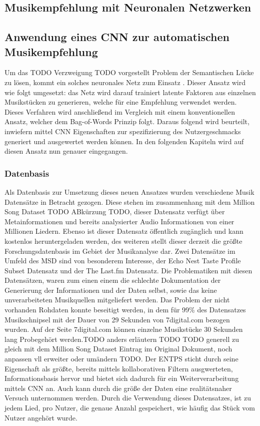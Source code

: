\documentclass[twosided,a4,10pt]{article}
\begin{document}
\begin{multicols}{2}
		\subsection{Musikempfehlung mit Neuronalen Netzwerken}
			\subsection*{Anwendung eines CNN zur automatischen Musikempfehlung}
		
		Um das TODO Verzweigung TODO vorgestellt Problem der Semantischen Lücke zu lösen, kommt ein solches neuronales Netz zum Einsatz \cite{oord}. Dieser Ansatz wird wie folgt umgesetzt: das Netz wird darauf trainiert latente Faktoren aus einzelnen Musikstücken zu generieren, welche für eine Empfehlung verwendet werden. Dieses Verfahren wird anschließend im Vergleich mit einem konventionellen Ansatz, welcher dem Bag-of-Words Prinzip folgt. Daraus folgend wird beurteilt, inwiefern mittel CNN Eigenschaften zur spezifizierung des Nutzergeschmacks generiert und ausgewertet werden können.  In den folgenden Kapiteln wird auf diesen Ansatz nun genauer eingegangen.
		
		\subsubsection{Datenbasis}
		
		Als Datenbasis zur Umsetzung dieses neuen Ansatzes wurden verschiedene Musik Datensätze in Betracht gezogen. Diese stehen im zusammenhang mit dem Million Song Dataset TODO ABkürzung TODO, dieser Datensatz verfügt über Metainformationen und bereits analysierter Audio Informationen von einer Millionen Liedern. Ebenso ist dieser Datensatz öffentlich zugänglich und kann kostenlos heruntergeladen werden, des weiteren stellt dieser derzeit die größte Forschungsdatenbasis im Gebiet der Musikanalyse dar. Zwei Datensätze im Umfeld des MSD sind von besonderem Interesse, der Echo Nest Taste Profile Subset Datensatz und der The Last.fm Datensatz. Die Problematiken mit diesen Datensätzen, waren zum einen einem die schlechte Dokumentation der Generierung der Informationen und der Daten selbst, sowie das keine unverarbeiteten Musikquellen mitgeliefert werden. Das Problem der nicht vorhanden Rohdaten konnte beseitigt werden, in dem für 99\% des Datensatzes Musikschnipsel mit der Dauer von 29 Sekunden von 7digital.com bezogen wurden. Auf der Seite 7digital.com können einzelne Musikstücke 30 Sekunden lang Probegehört werden.TODO anders erläutern TODO TODO generell zu gleich mit dem Million Song Dataset Eintrag im Original Dokument, noch anpassen vll erweiter oder umändern TODO. Der ENTPS sticht durch seine Eigenschaft als größte, bereits mittels kollaborativen Filtern ausgwerteten, Informationsbasis hervor und bietet sich dadurch für ein Weiterverarbeitung mittels CNN an. Auch kann durch die größe der Daten eine realitätsnaher Versuch unternommen werden. Durch die Verwendung dieses Datensatzes, ist zu jedem Lied, pro Nutzer, die genaue Anzahl gespeichert, wie häufig das Stück vom Nutzer angehört wurde. 
		

\end{multicols}
\end{document}
